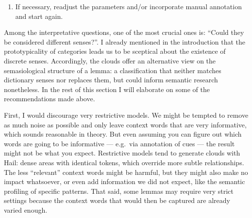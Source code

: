 \documentclass[
]{book}
\providecommand{\tightlist}{%
  \setlength{\itemsep}{0pt}\setlength{\parskip}{0pt}}
\begin{document}
\begin{enumerate}
  \begin{itemize}
  \tightlist
  \item
    What are the models saying? Are there collocates, lexically instantiated colligates, semantic preference, or neither? Are the clusters heterogeneous or homogeneous? Could they be considered different senses?
  \item
    Which medoids exhibit a more interpretable structure? What parameters do they represent?\footnote{For example, via a conditional tree with the clustering solution as response and the parameter settings as predictors.}
  \item
    How much more data is left to annotate?
  \end{itemize}
\item
  If necessary, readjust the parameters and/or incorporate manual annotation and start again.
\end{enumerate}

Among the interpretative questions, one of the most crucial ones is: ``Could they be considered different senses?''. I already mentioned in the introduction that the prototypicality of categories leads us to be sceptical about the existence of discrete senses. Accordingly, the clouds offer an alternative view on the semasiological structure of a lemma: a classification that neither matches dictionary senses nor replaces them, but could inform semantic research nonetheless. In the rest of this section I will elaborate on some of the recommendations made above.

First, I would discourage very restrictive models. We might be tempted to remove as much noise as possible and only leave context words that are very informative, which sounds reasonable in theory. But even assuming you can figure out which words are going to be informative --- e.g.~via annotation of cues --- the result might not be what you expect. Restrictive models tend to generate clouds with Hail: dense areas with identical tokens, which override more subtle relationships. The less ``relevant'' context words might be harmful, but they might also make no impact whatsoever, or even add information we did not expect, like the semantic profiling of specific patterns. That said, some lemmas may require very strict settings because the context words that would then be captured are already varied enough.
\end{document}
